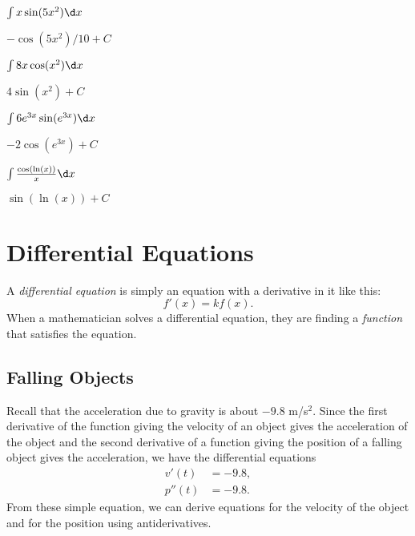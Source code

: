 \begin{exercises}
\begin{multicols}{2}
\begin{exercise}
$\int x \sin(5x^2) \d x$
\begin{answer}
$-\cos(5x^2)/10 +C$
\end{answer}
\end{exercise}

\columnbreak

\begin{exercise}
$\int 8x\cos(x^2)\d x$       
\begin{answer}
$4\sin(x^2)+C$
\end{answer}
\end{exercise}

\begin{exercise}
$\int 6e^{3x} \sin(e^{3x}) \d x$   
\begin{answer}
$-2\cos(e^{3x})+C$
\end{answer}
\end{exercise}

\begin{exercise}
$\int \frac{\cos(\ln(x))}{x} \d x$ 
\begin{answer}
$\sin(\ln(x)) + C$
\end{answer}
\end{exercise}
\end{multicols}
\end{exercises}















\section{Differential Equations}

A \textit{differential equation} is
simply an equation with a derivative in it like this:
\[
f'(x) = k f(x).
\]
When a mathematician solves a differential equation, they are finding
a \textit{function} that satisfies the equation.

\subsection*{Falling Objects}

Recall that the acceleration due to gravity is about $-9.8$
m/s$^2$. Since the first derivative of the function giving the
velocity of an object gives the acceleration of the object and the
second derivative of a function giving the position of a falling
object gives the acceleration, we have the differential equations
\begin{align*}
v'(t) &=  -9.8,\\
p''(t) &=  -9.8.
\end{align*}
From these simple equation, we can derive equations for the velocity of
the object and for the position using antiderivatives.


